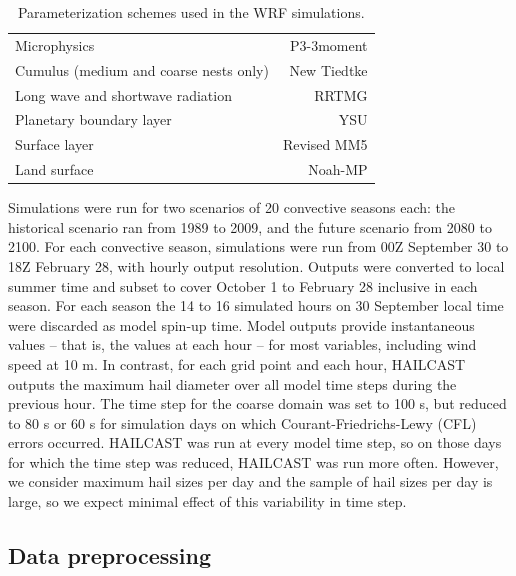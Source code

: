 \documentclass[]{agujournal2019}\usepackage[]{graphicx}\usepackage[]{xcolor}
\begin{document}
\begin{table}[!ht]
\caption{Parameterization schemes used in the WRF simulations.}
\label{tab:schemes}
\centering
\begin{tabular}{lr}
      \hline
      Microphysics & P3-3moment \cite{Milbrandt_JAS_2021} \\
      Cumulus (medium and coarse nests only) & New Tiedtke \cite{Zhang_JC_2017} \\
      Long wave and shortwave radiation & RRTMG \cite{Iacono_JGRA_2008} \\
      Planetary boundary layer & YSU \cite{Hong_MWR_2006} \\
      Surface layer & Revised MM5 \cite{Jimenez_MWR_2012} \\
      Land surface & Noah-MP \cite{Niu_JGRA_2011} \\
      \hline
\end{tabular}
\end{table}

Simulations were run for two scenarios of 20 convective seasons each: the historical scenario ran from 1989 to 2009, and the future scenario from 2080 to 2100. For each convective season, simulations were run from 00Z September 30 to 18Z February 28, with hourly output resolution. Outputs were converted to local summer time and subset to cover October 1 to February 28 inclusive in each season. For each season the 14 to 16 simulated hours on 30 September local time were discarded as model spin-up time. Model outputs provide instantaneous values -- that is, the values at each hour -- for most variables, including wind speed at 10 m. In contrast, for each grid point and each hour, HAILCAST outputs the maximum hail diameter over all model time steps during the previous hour. The time step for the coarse domain was set to 100 s, but reduced to 80 s or 60 s for simulation days on which Courant-Friedrichs-Lewy (CFL) errors occurred. HAILCAST was run at every model time step, so on those days for which the time step was reduced, HAILCAST was run more often. However, we consider maximum hail sizes per day and the sample of hail sizes per day is large, so we expect minimal effect of this variability in time step.

\subsection{Data preprocessing}
\end{document}
